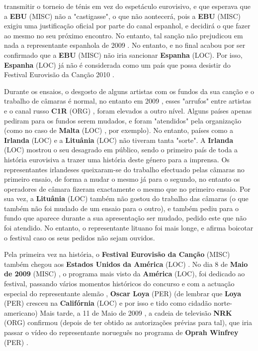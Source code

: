 \documentclass[12pt,a4paper]{article}
\begin{document}
transmitir o torneio de ténis em vez do espetáculo eurovisivo, e que esperava que a \textbf{EBU} (MISC) não a "castigasse", o que não aontecerá, pois a \textbf{EBU} (MISC) exigiu uma justificação oficial por parte do canal espanhol, e decidirá o que fazer ao mesmo no seu próximo encontro. No entanto, tal sanção não prejudicou em nada a representante espanhola de 2009 . No entanto, e no final acabou por ser confirmado que a \textbf{EBU} (MISC) não iria sancionar \textbf{Espanha} (LOC). Por isso, \textbf{Espanha} (LOC) já não é considerada como um país que possa desistir do Festival Eurovisão da Canção 2010 .

Durante os ensaios, o desgosto de alguns artistas com os fundos da sua canção e o trabalho de câmaras é normal, no entanto em 2009 , esses "arrufos" entre artistas e o canal russo \textbf{C1R} (ORG) , foram elevados a outro nível. Alguns países apenas pediram para os fundos serem mudados, e foram "atendidos" pela organização (como no caso de \textbf{Malta} (LOC) , por exemplo). No entanto, países como a \textbf{Irlanda} (LOC) e a \textbf{Lituânia} (LOC) não tiveram tanta "sorte". A \textbf{Irlanda} (LOC) mostrou o seu desagrado em público, sendo o primeiro país de toda a história eurovisiva a trazer uma história deste género para a imprensa. Os representantes irlandeses queixaram-se do trabalho efectuado pelas câmaras no primeiro ensaio, de forma a mudar o mesmo já para o segundo, no entanto os operadores de câmara fizeram exactamente o mesmo que no primeiro ensaio. Por sua vez, a \textbf{Lituânia} (LOC) também não gostou do trabalho das câmaras (o que também não foi mudado de um ensaio para o outro), e também pediu para o fundo que aparece durante a sua apresentação ser mudado, pedido este que não foi atendido. No entanto, o representante lituano foi mais longe, e afirma boicotar o festival caso os seus pedidos não sejam ouvidos.

Pela primeira vez na história, o \textbf{Festival Eurovisão da Canção} (MISC) também chegou aos \textbf{Estados Unidos da América} (LOC) . No dia 8 de \textbf{Maio de 2009} (MISC) , o programa mais visto da \textbf{América} (LOC), foi dedicado ao festival, passando vários momentos históricos do concurso e com a actuação especial do representante alemão , \textbf{Oscar Loya} (PER) (de lembrar que \textbf{Loya} (PER) cresceu na \textbf{Califórnia} (LOC) e por isso e tido como cidadão norte-americano) Mais tarde, a 11 de Maio de 2009 , a cadeia de televisão \textbf{NRK} (ORG) confirmou (depois de ter obtido as autorizações prévias para tal), que iria passar o vídeo do representante norueguês no programa de \textbf{Oprah Winfrey} (PER) .
\end{document}
